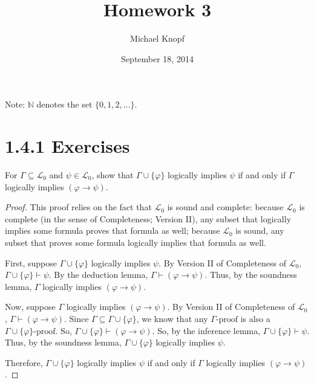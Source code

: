 \documentclass[12pt]{article}
\newcommand{\N}{\mathbb{N}}
\newenvironment{exercise}[2][Exercise]{\begin{trivlist}
\item[\hskip \labelsep {\bfseries #1}\hskip \labelsep {\bfseries #2.}]}{\end{trivlist}}
\begin{document}
 
 
\title{Homework 3}
\author{Michael Knopf}
\date{September 18, 2014}
 
\maketitle

\noindent Note: $\N$ denotes the set $\{0, 1, 2, \dots \}$.

\section*{1.4.1 Exercises}

\begin{exercise}{2}

For $\Gamma \subseteq \mathcal{L}_0$ and $\psi \in \mathcal{L}_0$, show that $\Gamma \cup \{ \varphi \}$ logically implies $\psi$ if and only if $\Gamma$ logically implies $(\varphi \to \psi)$.

\end{exercise}

\begin{proof}

This proof relies on the fact that $\mathcal{L}_0$ is sound and complete: because $\mathcal{L}_0$ is complete (in the sense of Completeness; Version II), any subset that logically implies some formula proves that formula as well; because $\mathcal{L}_0$ is sound, any subset that proves some formula logically implies that formula as well.

First, suppose $\Gamma \cup \{ \varphi \}$ logically implies $\psi$.  By Version II of Completeness of $\mathcal{L}_0$, $\Gamma \cup \{ \varphi \} \vdash \psi$.  By the deduction lemma, $\Gamma \vdash (\varphi \to \psi)$.  Thus, by the soundness lemma, $\Gamma$ logically implies $(\varphi \to \psi)$.

Now, suppose $\Gamma$ logically implies $(\varphi \to \psi)$.  By Version II of Completeness of $\mathcal{L}_0$, $\Gamma \vdash (\varphi \to \psi)$.  Since $\Gamma \subseteq \Gamma \cup \{ \varphi \}$, we know that any $\Gamma \textrm{-proof}$ is also a $\Gamma \cup \{ \varphi \} \textrm{-proof}$.  So, $\Gamma \cup \{ \varphi \} \vdash (\varphi \to \psi)$.  So, by the inference lemma, $\Gamma \cup \{ \varphi \} \vdash \psi$.  Thus, by the soundness lemma, $\Gamma \cup \{ \varphi \}$ logically implies $\psi$.

Therefore, $\Gamma \cup \{ \varphi \}$ logically implies $\psi$ if and only if $\Gamma$ logically implies $(\varphi \to \psi)$.

\end{proof}
\end{document}
